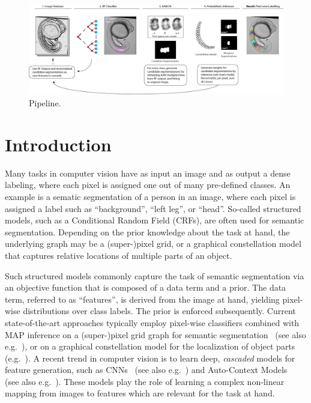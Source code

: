 \documentclass[10pt,twocolumn,letterpaper]{article}
\begin{document}
\begin{figure}[t]
\begin{center}
\includegraphics[width=\textwidth]{pipelineBIG2.jpg} %
\caption{Pipeline.}
\label{fig:pipeline}
\end{center}
\end{figure}


\section{Introduction}
Many tasks in computer vision have as input an image and as output a dense labeling, where each pixel is assigned one out of many pre-defined classes. An example is a sematic segmentation of a person in an image, where each pixel is assigned a label such as “background”, “left leg”, or “head”. 
%
So-called structured models, such as a Conditional Random Field (CRFs), are often used for semantic segmentation. 
Depending on the prior knowledge about the task at hand, the underlying graph may be a (super-)pixel grid, or a graphical constellation model that captures relative locations of multiple parts of an object. 
%

Such structured models commonly capture the task of semantic segmentation via an objective function that is composed of a data term and a prior. 
%
The data term, referred to as ``features'', is derived from the image at hand, yielding pixel-wise distributions over class labels. The prior is enforced subsequently. 
%
%
Current state-of-the-art approaches typically employ pixel-wise classifiers combined with MAP inference on a (super-)pixel grid graph for semantic segmentation~\cite{TextonBoost,Schroff08objectclass} (see also e.g.\ \cite{funke2014candidate}), or on a graphical constellation model for the localization of object parts (e.g.\ \cite{Glocker2012,Glocker2013,TeethMICCAI2012,SeifertAnatomicalSPIE2009}).  
%
A recent trend in computer vision is to learn deep, \emph{cascaded} models for feature generation, such as CNNs~\cite{NIPS2012_4824} (see also e.g.\ \cite{funke2014candidate}) and Auto-Context Models~\cite{AutoContext2008} (see also e.g.\ \cite{PoseMachinesECCV2014}). 
%
These models play the role of learning a complex non-linear mapping from images to features which are relevant for the task at hand. 
\end{document}
